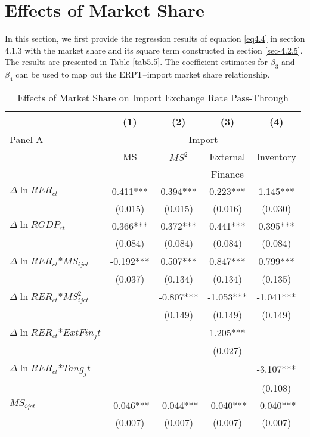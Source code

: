 \section{Effects of Market Share}

In this section, we first provide the regression results of equation \ref{eq4.4} in section 4.1.3 with the market share and its square term constructed in section \ref{sec-4.2.5}. The results are presented in Table \ref{tab5.5}. The coefficient estimates for $\beta_3$ and $\beta_4$ can be used to map out the ERPT–import market share relationship.

\begin{table}[htb]
	\centering
	\caption{Effects of Market Share on Import Exchange Rate Pass-Through}
	\begin{threeparttable}
	\begin{tabular}{lcccc}
		\toprule
		& (1)   & (2)   & (3)   & (4) \\
		\midrule
		Panel A & \multicolumn{4}{c}{Import} \\
		& MS    & $MS^2$ & External & Inventory \\
		&       &       & Finance &  \\
		\midrule
		$\Delta \ln RER_{ct}$ & 0.411*** & 0.394*** & 0.223*** & 1.145*** \\
		& (0.015) & (0.015) & (0.016) & (0.030) \\
		$\Delta \ln RGDP_{ct}$ & 0.366*** & 0.372*** & 0.441*** & 0.395*** \\
		& (0.084) & (0.084) & (0.084) & (0.084) \\
		$\Delta \ln RER_{ct}$*$MS_{ijct}$ & -0.192*** & 0.507*** & 0.847*** & 0.799*** \\
		& (0.037) & (0.134) & (0.134) & (0.135) \\
		$\Delta \ln RER_{ct}$*$MS_{ijct}^2$ &       & -0.807*** & -1.053*** & -1.041*** \\
		&       & (0.149) & (0.149) & (0.149) \\
		$\Delta \ln RER_{ct}$*$ExtFin_jt$ &       &       & 1.205*** &  \\
		&       &       & (0.027) &  \\
		$\Delta \ln RER_{ct}$*$Tang_jt$ &       &       &       & -3.107*** \\
		&       &       &       & (0.108) \\
		$MS_{ijct}$ & -0.046*** & -0.044*** & -0.040*** & -0.040*** \\
		 & (0.007) & (0.007) & (0.007) & (0.007) \\

\end{tabular}
\end{threeparttable}
\end{table}
